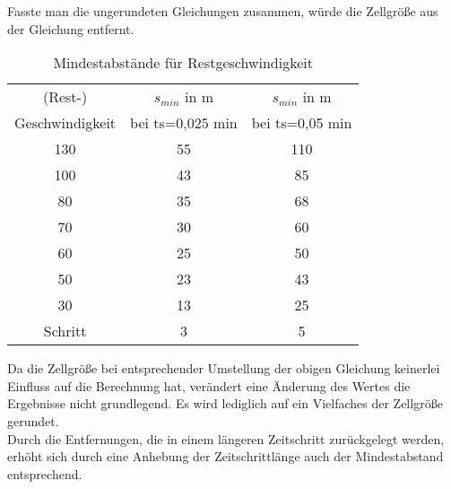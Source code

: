 Fasste man die ungerundeten Gleichungen zusammen, würde die Zellgröße aus der Gleichung entfernt.

\begin{table}[ht]
\begin{center}
\setlength{\tabcolsep}{0.5em} %
{\renewcommand{\arraystretch}{1.2}%
\begin{tabular}{| c  c  c |}
\hline 
(Rest-) & $ s_{min} $ in m & $ s_{min} $ in m  \\ 
Geschwindigkeit & bei ts=0,025 min & bei ts=0,05 min \\ \hline 
130 & 55 & 110 \\ 
100 & 43 & 85 \\ 
80 & 35 & 68 \\ 
70 & 30 & 60 \\ 
60 & 25 & 50 \\ 
50 & 23 & 43 \\ 
30 & 13 & 25 \\ 
Schritt & 3 & 5 \\ \hline
\end{tabular}
}
\caption{Mindestabstände für Restgeschwindigkeit}
\label{tab:restgeschw-abstand}
\end{center}
\end{table}

Da die Zellgröße bei entsprechender Umstellung der obigen Gleichung keinerlei Einfluss auf die Berechnung hat, verändert eine Änderung des Wertes die Ergebnisse nicht grundlegend. 
Es wird lediglich auf ein Vielfaches der Zellgröße gerundet.
\\
Durch die Entfernungen, die in einem längeren Zeitschritt zurückgelegt werden, erhöht sich durch eine Anhebung der Zeitschrittlänge auch der Mindestabstand entsprechend.
